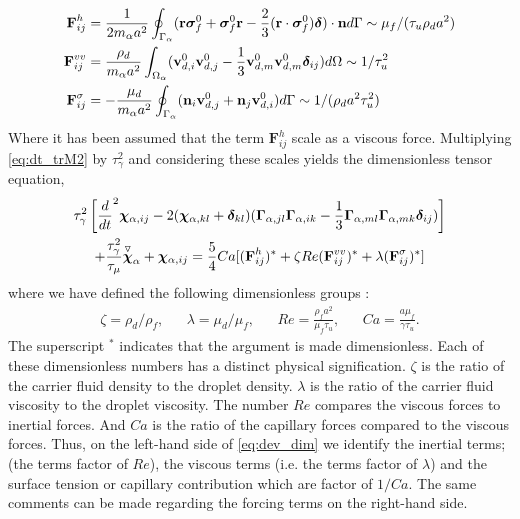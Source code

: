 \begin{align}
    \textbf{F}_{ij}^h
    &= \frac{1}{2m_\alpha a^2}\oint_{\Gamma_{\alpha}} (\textbf{r}\bm\sigma_f^0 + \bm\sigma_f^0\textbf{r} - \frac{2}{3}(\textbf{r}\cdot \bm\sigma_f^0) \bm\delta)\cdot \textbf{n} d\Gamma 
    \sim\mu_f  /(\tau_u \rho_d a^2)\\
    \textbf{F}_{ij}^{vv}
    &= 
    \frac{ \rho_d}{m_\alpha a^2}\int_{\Omega_{\alpha}} (\textbf{v}_{d,i}^0\textbf{v}_{d,j}^0 - \frac{1}{3}\textbf{v}_{d,m}^0\textbf{v}_{d,m}^0 \bm\delta_{ij})  d\Omega
    \sim 1/\tau_u^2\\
    \textbf{F}_{ij}^{\sigma}
    &= - \frac{  \mu_d}{m_\alpha a^2} \oint_{\Gamma_{\alpha}} (\textbf{n}_i \textbf{v}_{d,j}^0 + \textbf{n}_j \textbf{v}_{d,i}^0) d\Gamma\sim 1 /(\rho_d  a^2  \tau_u^2)
\end{align}
Where it has been assumed that the term $\textbf{F}_{ij}^h$ scale as a viscous force. 
Multiplying \ref{eq:dt_trM2} by $\tau_\gamma^2$ and considering these scales yields the dimensionless tensor equation, 
\begin{multline}
    \tau_\gamma^2
    \left[
        \ddt^2 \bm\chi_{\alpha,ij}
        -  2 (\bm\chi_{\alpha,kl} + \bm\delta_{kl})
        (\bm\Gamma_{\alpha,jl}\bm\Gamma_{\alpha,ik}  
        - \frac{1}{3}
        \bm\Gamma_{\alpha,ml}\bm\Gamma_{\alpha,mk}  
        \bm\delta_{ij}
        )
    \right]\\
    + \frac{\tau_\gamma^2}{\tau_\mu} \overset{ \triangledown  }{\bm\chi}_\alpha
    + \bm\chi_{\alpha,ij}
    =\frac{5}{4} Ca [
    (\textbf{F}_{ij}^h )^*
    + \zeta Re (\textbf{F}_{ij}^{vv})^*
    + \lambda (\textbf{F}_{ij}^{\sigma})^*
    ] 
    \label{eq:dev_dim}
\end{multline}
where we have defined the following dimensionless groups : 
\begin{align*}
    \zeta = \rho_d /\rho_f,
    && \lambda = \mu_d/\mu_f,
    && Re = \frac{\rho_f a^2 }{ \mu_f \tau_u},
    && Ca = \frac{a \mu_f}{\gamma \tau_u}. 
\end{align*}
The superscript $^*$ indicates that the argument is made dimensionless. 
Each of these dimensionless numbers has a distinct physical signification. 
$\zeta$ is the ratio of the carrier fluid density to the droplet density. 
$\lambda$ is the ratio of the carrier fluid viscosity to the droplet viscosity. 
The number $Re$ compares the viscous forces to inertial forces. 
And $Ca$ is the ratio of the capillary forces compared to the viscous forces. 
Thus, on the left-hand side of \ref{eq:dev_dim} we identify the inertial terms; (the terms factor of $Re$), the viscous terms (i.e. the terms factor of $\lambda$) and the surface tension or capillary contribution which are factor of $1/Ca$. 
The same comments can be made regarding the forcing terms on the right-hand side. 



